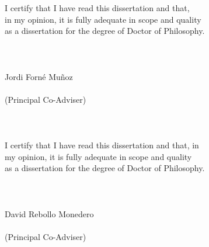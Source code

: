 \noindent 
I certify that I have read this dissertation and that, \\
in my opinion, it is fully adequate in scope and quality \\
as a dissertation for the degree of Doctor of Philosophy. \\
\\
\\
\\
\noindent
Jordi Forn\'e Mu\~noz\\
\\
\noindent
(Principal Co-Adviser)\\
\\
\\
\\
\noindent 
I certify that I have read this dissertation and that, in \\
my opinion, it is fully adequate in scope and quality \\
as a dissertation for the degree of Doctor of Philosophy. \\
\\
\\
\\
\noindent
David Rebollo Monedero \\
\\
\noindent
(Principal Co-Adviser)

